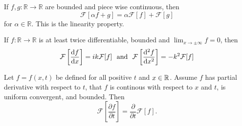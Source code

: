 \begin{theorem}
	\begin{description}[style=unboxed,leftmargin=0.4cm]
		\item[1] {
			If $f,g:\mathbb{R} \rightarrow \mathbb{R}$ are bounded and piece wise continuous, then 
			\begin{equation}
				\mathcal{F}[\alpha f + g] = \alpha \mathcal{F}[f] + \mathcal{F}[g] 
			\end{equation}
			for  $\alpha \in \mathbb{R}.$ This is the linearity property. 
		}
		\item[2] {
		If $f: \mathbb{R} \rightarrow \mathbb{R}$ is at least twice differentiable, bounded and 
		$\lim_{x \rightarrow \pm \infty} f = 0$, then   
			\begin{equation}
			\mathcal{F}\left[\frac{\mathrm{d} f}{\mathrm{d} x}\right] = ik \mathcal{F}[f] \ \ \text{and} 
			\ \ \mathcal{F}\left[\frac{\mathrm{d}^2 f}{\mathrm{d} x^2}\right] = -k^2 \mathcal{F}[f]
			\end{equation}
		}
		\item[3]{ 
		Let $f=f(x,t)$ be defined for all positive $t$ and $x\in \mathbb{R}$. Assume $f$ has partial derivative with respect 
			to $t$, that $f$ is continous with respect to $x$ and $t$, is uniform convergent, and bounded. Then  
		\begin{equation}
			\label{eq:ftransprop3}
			\mathcal{F}\left[\frac{\partial f}{\partial t}\right] = \frac{\partial}{\partial t} \mathcal{F}[f].
		\end{equation}
			}
	\end{description}	
\end{theorem}

